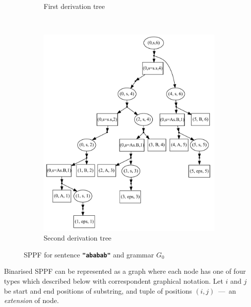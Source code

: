 \begin{figure}[ht]
\begin{center}
\begin{subfigure}[b]{0.3\textwidth}
        \caption{First derivation tree}
        \label{tree1}        
    \end{subfigure}
    ~
    \begin{subfigure}[b]{0.3\textwidth}
        \includegraphics[width=\textwidth]{dot/Brackets2.pdf}
        \caption{Second derivation tree}
        \label{tree2}        
    \end{subfigure}
    \caption{SPPF for sentence \textbf{\texttt{"ababab"}} and grammar $G_0$}
    \label{sppfSample}
    \end{center}                
\end{figure}

Binarised SPPF can be represented as a graph where each node has one of four types which described below with correspondent graphical notation.
Let $i$ and $j$ be start and end positions of substring, and tuple of positions $(i,j)$~---~an \textit{extension} of node.

